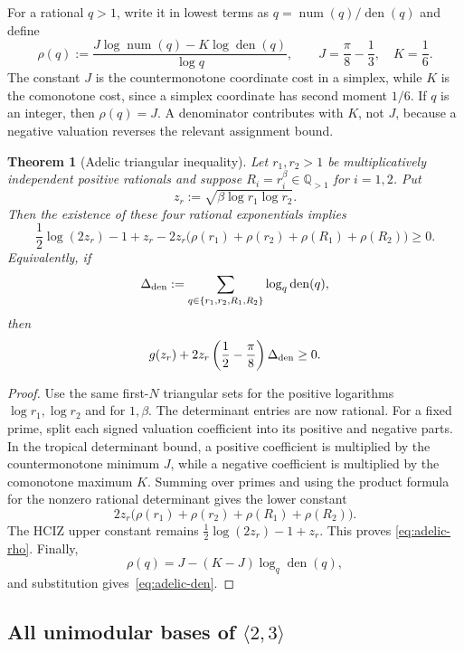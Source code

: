 \documentclass[11pt,oneside]{article}
\newtheorem{theorem}{Theorem}[section]
\theoremstyle{definition}
\theoremstyle{remark}
\newcommand{\Q}{\mathbb Q}
\newcommand{\num}{\operatorname{num}}
\newcommand{\den}{\operatorname{den}}
\begin{document}
For a rational $q>1$, write it in lowest terms as
$q=\num(q)/\den(q)$ and define
\begin{equation}\label{eq:rho}
 \rho(q):=
 \frac{J\log\num(q)-K\log\den(q)}{\log q},
 \qquad
 J=\frac\pi8-\frac13,\quad K=\frac16.
\end{equation}
The constant $J$ is the countermonotone coordinate cost in a simplex, while
$K$ is the comonotone cost, since a simplex coordinate has second moment
$1/6$.  If $q$ is an integer, then $\rho(q)=J$.  A denominator contributes with
$K$, not $J$, because a negative valuation reverses the relevant assignment
bound.

\begin{theorem}[Adelic triangular inequality]\label{thm:adelic-triangle}
Let $r_1,r_2>1$ be multiplicatively independent positive rationals and suppose
$R_i=r_i^\beta\in\Q_{>1}$ for $i=1,2$.  Put
\[
 z_r:=\sqrt{\beta\log r_1\log r_2}.
\]
Then the existence of these four rational exponentials implies
\begin{equation}\label{eq:adelic-rho}
 \frac12\log(2z_r)-1+z_r
 -2z_r\bigl(\rho(r_1)+\rho(r_2)+\rho(R_1)+\rho(R_2)\bigr)\ge0.
\end{equation}
Equivalently, if
\[
 \Delta_{\rm den}:=
 \sum_{q\in\{r_1,r_2,R_1,R_2\}}\log_q\den(q),
\]
then
\begin{equation}\label{eq:adelic-den}
 g(z_r)+2z_r\left(\frac12-\frac\pi8\right)\Delta_{\rm den}\ge0.
\end{equation}
\end{theorem}
\begin{proof}
Use the same first-$N$ triangular sets for the positive logarithms
$\log r_1,\log r_2$ and for $1,\beta$.  The determinant entries are now
rational.  For a fixed prime, split each signed valuation coefficient into its
positive and negative parts.  In the tropical determinant bound, a positive
coefficient is multiplied by the countermonotone minimum $J$, while a negative
coefficient is multiplied by the comonotone maximum $K$.  Summing over primes
and using the product formula for the nonzero rational determinant gives the
lower constant
\[
 2z_r\bigl(\rho(r_1)+\rho(r_2)+\rho(R_1)+\rho(R_2)\bigr).
\]
The HCIZ upper constant remains $\tfrac12\log(2z_r)-1+z_r$.  This proves
\eqref{eq:adelic-rho}.  Finally,
\[
 \rho(q)=J-(K-J)\log_q\den(q),
\]
and substitution gives~\eqref{eq:adelic-den}.
\end{proof}

\subsection{All unimodular bases of \texorpdfstring{$\langle2,3\rangle$}{the two-base group}}
\end{document}
